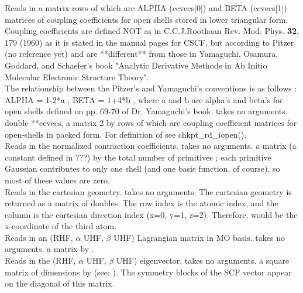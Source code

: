 \noindent {}
{Reads in a matrix rows of which are 
ALPHA (ccvecs[0]) and BETA (ccvecs[1]) matrices of coupling
coefficients for open shells stored in lower triangular form.
Coupling coefficients are defined NOT as in 
C.C.J.Roothaan Rev. Mod. Phys. {\bf 32}, 179 (1960) as it is stated in the
manual pages for CSCF, but according to Pitzer (no reference yet)
and are **different** from those in Yamaguchi, Osamura, Goddard, and
Schaefer's book "Analytic Derivative Methods in Ab Initio Molecular
Electronic Structure Theory".\\
The relationship between the Pitzer's and Yamaguchi's conventions is 
as follows : ALPHA = 1-2*a , BETA = 1+4*b , where a and b are 
alpha's and beta's for open shells 
defined on pp. 69-70 of Dr. Yamaguchi's book.
}
{takes no arguments.}
{double **ccvecs, a matrix 2 by  rows of which are coupling
coefficient matrices for open-shells in packed form.
For definition of  see chkpt\_rd\_iopen().} \\

\noindent {}
{Reads in the normalized contraction coefficients.}
{takes no arguments.}
{a matrix  (a constant defined in ???)
by the total number of primitives ;
each primitive Gaussian contributes to only one shell (and one
basis function, of course), so most of these values are zero.} \\

\noindent {}
{Reads in the cartesian geometry.}
{takes no arguments.}
{The cartesian geometry is returned as a matrix
of doubles.  The row index is the atomic index, and the column is the
cartesian direction index (x=0, y=1, z=2).  Therefore, 
would be the x-coordinate of the third atom.} \\

\noindent {}
{Reads in an (RHF, $\alpha$ UHF, $\beta$ UHF) Lagrangian matrix in MO basis.}
{takes no arguments.}
{a matrix  by .} \\

\noindent {}
{Reads in the (RHF, $\alpha$ UHF, $\beta$ UHF) eigenvector.}
{takes no arguments.}
{a square matrix of dimensions 
by  (see: ).
The symmetry blocks of the SCF vector appear
on the diagonal of this matrix.} \\

